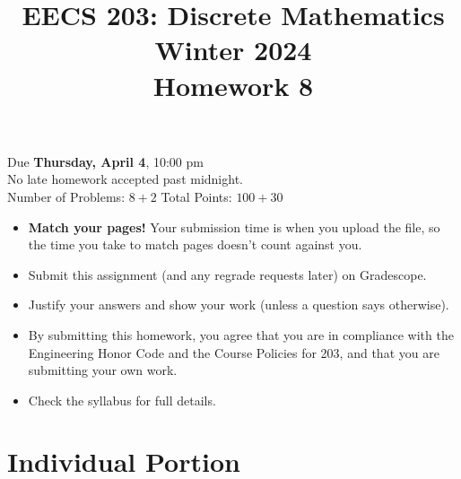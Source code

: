 \documentclass[12pt]{exam}
\newcommand{\hwnum}{8}
\begin{document}
\title{EECS 203: Discrete Mathematics\\
  Winter 2024\\
  Homework \hwnum{}}
\date{}
\author{}
\maketitle
\vspace{-50pt}
\begin{center}
  \huge Due \textbf{Thursday, April 4}, 10:00 pm\\
\Large No late homework accepted past midnight.\\
\vspace{10pt}
\large Number of Problems: $8+2$
\hspace{3cm}
Total Points: $100+30$
\end{center}
\vspace{25pt}
\begin{itemize}
    \item \textbf{Match your pages!} Your submission time is when you upload the file, so the time you take to match pages doesn't count against you.
    \item Submit this assignment (and any regrade requests later) on Gradescope. 
    \item Justify your answers and show your work (unless a question says otherwise).
    \item By submitting this homework, you agree that you are in compliance with the Engineering Honor Code and the Course Policies for 203, and that you are submitting your own work.
    \item Check the syllabus for full details.
\end{itemize}
\newpage

\section*{Individual Portion}
\end{document}

